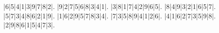 \begin{sudoku}
|6|5|4|1|3|9|7|8|2|.
|9|2|7|5|6|8|3|4|1|.
|3|8|1|7|4|2|9|6|5|.
|8|4|9|3|2|1|6|5|7|.
|5|7|3|4|8|6|2|1|9|.
|1|6|2|9|5|7|8|3|4|.
|7|3|5|8|9|4|1|2|6|.
|4|1|6|2|7|3|5|9|8|.
|2|9|8|6|1|5|4|7|3|.
\end{sudoku}
